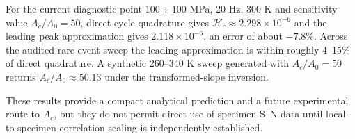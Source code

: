For the current diagnostic point $100\pm100$ MPa, 20 Hz, 300 K and sensitivity value $A_c/A_0=50$, direct cycle quadrature gives $\mathcal H_c\approx2.298\times10^{-6}$ and the leading peak approximation gives $2.118\times10^{-6}$, an error of about $-7.8\%$. Across the audited rare-event sweep the leading approximation is within roughly 4--15\% of direct quadrature. A synthetic 260--340 K sweep generated with $A_c/A_0=50$ returns $A_c/A_0\approx50.13$ under the transformed-slope inversion.

These results provide a compact analytical prediction and a future experimental route to $A_c$, but they do not permit direct use of specimen S--N data until local-to-specimen correlation scaling is independently established.
